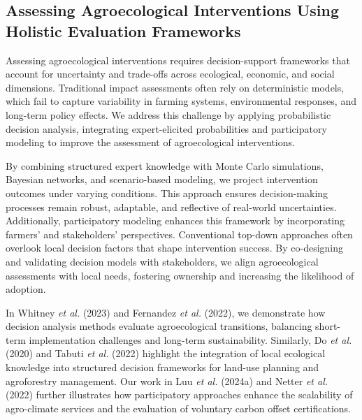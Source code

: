 \documentclass[
]{article}
\begin{document}
\hypertarget{assessing-agroecological-interventions-using-holistic-evaluation-frameworks}{%
\subsection{Assessing Agroecological Interventions Using Holistic
Evaluation
Frameworks}\label{assessing-agroecological-interventions-using-holistic-evaluation-frameworks}}

Assessing agroecological interventions requires decision-support
frameworks that account for uncertainty and trade-offs across
ecological, economic, and social dimensions. Traditional impact
assessments often rely on deterministic models, which fail to capture
variability in farming systems, environmental responses, and long-term
policy effects. We address this challenge by applying probabilistic
decision analysis, integrating expert-elicited probabilities and
participatory modeling to improve the assessment of agroecological
interventions.

By combining structured expert knowledge with Monte Carlo simulations,
Bayesian networks, and scenario-based modeling, we project intervention
outcomes under varying conditions. This approach ensures decision-making
processes remain robust, adaptable, and reflective of real-world
uncertainties. Additionally, participatory modeling enhances this
framework by incorporating farmers' and stakeholders' perspectives.
Conventional top-down approaches often overlook local decision factors
that shape intervention success. By co-designing and validating decision
models with stakeholders, we align agroecological assessments with local
needs, fostering ownership and increasing the likelihood of adoption.

In Whitney \emph{et al.} (2023) and Fernandez \emph{et al.} (2022), we
demonstrate how decision analysis methods evaluate agroecological
transitions, balancing short-term implementation challenges and
long-term sustainability. Similarly, Do \emph{et al.} (2020) and Tabuti
\emph{et al.} (2022) highlight the integration of local ecological
knowledge into structured decision frameworks for land-use planning and
agroforestry management. Our work in Luu \emph{et al.} (2024a) and
Netter \emph{et al.} (2022) further illustrates how participatory
approaches enhance the scalability of agro-climate services and the
evaluation of voluntary carbon offset certifications.
\end{document}
